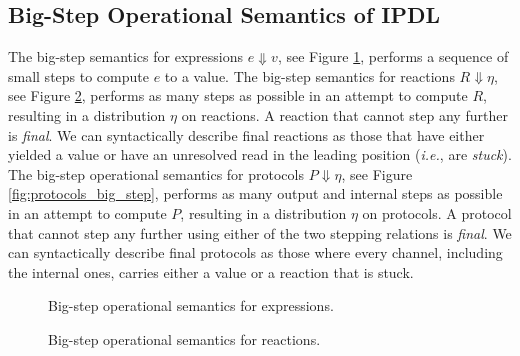 \subsection{Big-Step Operational Semantics of IPDL}

The big-step semantics for expressions $e \Downarrow v$, see Figure \ref{fig:expressions_big_step}, performs a sequence of small steps to compute $e$ to a value. The big-step semantics for reactions $R \Downarrow \eta$, see Figure \ref{fig:reactions_big_step}, performs as many steps as possible in an attempt to compute $R$, resulting in a distribution $\eta$ on reactions. A reaction that cannot step any further is \emph{final}. We can syntactically describe final reactions as those that have either yielded a value or have an unresolved read in the leading position (\emph{i.e.}, are \emph{stuck}). The big-step operational semantics for protocols $P \Downarrow \eta$, see Figure \ref{fig:protocols_big_step}, performs as many output and internal steps as possible in an attempt to compute $P$, resulting in a distribution $\eta$ on protocols. A protocol that cannot step any further using either of the two stepping relations is \emph{final}. We can syntactically describe final protocols as those where every channel, including the internal ones, carries either a value or a reaction that is stuck.

\begin{figure}
\caption{Big-step operational semantics for \ipdl expressions.}
\label{fig:expressions_big_step}
\end{figure}

\begin{figure}
\caption{Big-step operational semantics for \ipdl reactions.}
\label{fig:reactions_big_step}
\end{figure}

